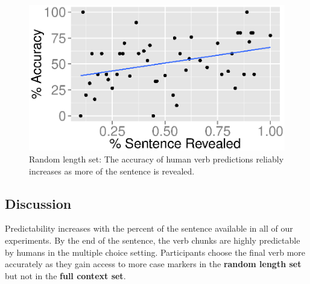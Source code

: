 \begin{figure}[t!]
 \begin{center}
 \includegraphics[width=1.0\linewidth]{2016_conll_verbpred/figures/rand-pref-len}
 \caption{Random length set: The accuracy of human verb predictions
   reliably increases as more of the sentence is revealed. }
 \label{fig:rand_prefix}
\end{center}
\end{figure}

\subsection{Discussion}

Predictability increases with the percent of the sentence available in all of
our experiments.  By the end of the sentence, the verb chunks are highly
predictable by humans in the multiple choice setting.  Participants choose the
final verb more accurately as they gain access to more case markers in the {\bf
  random length set} but not in the {\bf full context set}.

